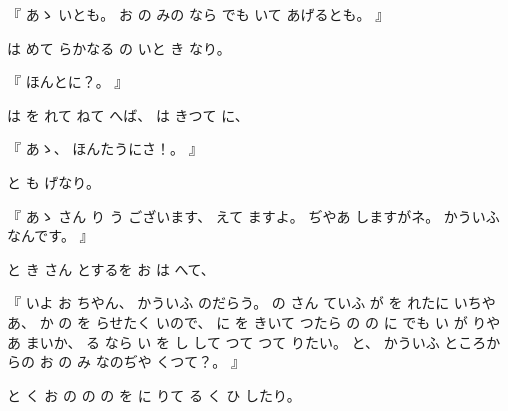 %
『
あゝ
いとも。
%
お
の
みの
なら
でも
いて
あげるとも。
』

%
は
めて
らかなる
の
いと
き
なり。

%
『
ほんとに？。
』

%
は
を
れて
ねて
へば、
%
は
きつて
に、

%
『
あゝ、
%
ほんたうにさ！。
』

%
と
も
げなり。

%
『
あゝ
さん
り
う
ございます、
%
えて%
ますよ。
%
ぢやあ
しますがネ。
%
かういふ
なんです。
』

%
と
き
さん
とするを
お
は
へて、

%
『
いよ
お
ちやん、
%
かういふ
のだらう。
%
の
さん
ていふ
%
が
を
れたに
いちやあ、
%
か
の
を
らせたく
いので、
%
に
を
きいて
つたら
の
の
に
でも
い
が
りやあ
まいか、
%
る
なら
い
を
し
して
つて
%
つて
りたい。
%
と、
%
かういふ
ところからの
お
の
み
なのぢや
くつて？。
』

%
と
く
お
の
の
の
を
に
りて
る
く
ひ
したり。

